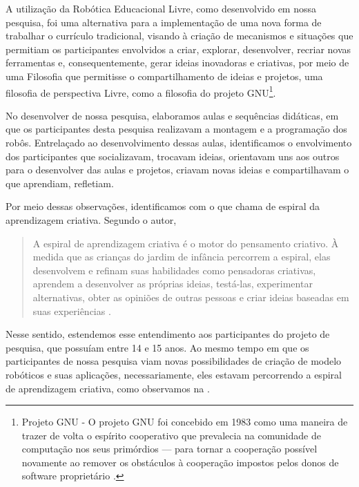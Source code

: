 \documentclass{textolivre}
\begin{document}
A utilização da Robótica Educacional Livre, como desenvolvido em nossa pesquisa, foi uma alternativa para a implementação de uma nova forma de trabalhar o currículo tradicional,  visando à criação de mecanismos e situações que permitiam os participantes envolvidos a criar, explorar, desenvolver, recriar novas ferramentas e, consequentemente, gerar ideias inovadoras e criativas, por meio de uma Filosofia que permitisse o compartilhamento de ideias e projetos, uma filosofia de perspectiva Livre, como a filosofia do projeto GNU\footnote{Projeto GNU - O projeto GNU foi concebido em 1983 como uma maneira de trazer de volta o espírito cooperativo que
prevalecia na comunidade de computação nos seus primórdios — para tornar a cooperação possível novamente ao remover
os obstáculos à cooperação impostos pelos donos de software proprietário \cite{foundation}.}.

No desenvolver de nossa pesquisa, elaboramos aulas e sequências didáticas, em que os participantes desta pesquisa realizavam a montagem e a programação dos robôs. Entrelaçado ao desenvolvimento dessas aulas, identificamos o envolvimento dos participantes que socializavam, trocavam ideias, orientavam uns aos outros para o desenvolver das aulas e projetos, criavam novas ideias e compartilhavam o que aprendiam, refletiam.

Por meio dessas observações, identificamos com o que \textcite{resnick2020} chama de espiral da aprendizagem criativa. Segundo o autor,

\begin{quote}
A espiral de aprendizagem criativa é o motor do pensamento criativo. À medida que as crianças do jardim de infância percorrem a espiral, elas desenvolvem e refinam suas habilidades como pensadoras criativas, aprendem a desenvolver as próprias ideias, testá-las, experimentar alternativas, obter as opiniões de outras pessoas e criar ideias baseadas em suas experiências \cite[p. 39]{resnick2020}.
\end{quote}

Nesse sentido, estendemos esse entendimento aos participantes do projeto de pesquisa, que possuíam entre 14 e 15 anos. Ao mesmo tempo em que os participantes de nossa pesquisa viam novas possibilidades de criação de modelo robóticos e suas aplicações, necessariamente, eles estavam percorrendo a espiral de aprendizagem criativa, como observamos na .
\end{document}
